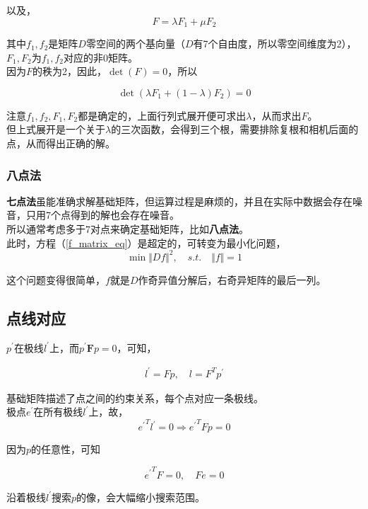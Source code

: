 		以及，
		$$
			F = \lambda F_1 + \mu F_2
		$$

		其中$f_1,f_2$是矩阵$D$零空间的两个基向量（$D$有7个自由度，所以零空间维度为2），$F_1,F_2$为$f_1,f_2$对应的非0矩阵。\\

		因为$F$的秩为2，因此，$\det(F) = 0$，所以

		$$
			\det(\lambda F_1 + (1-\lambda) F_2) = 0
		$$

		注意$f_1,f_2,F_1,F_2$都是确定的，上面行列式展开便可求出$\lambda$，从而求出$F$。\\

		但上式展开是一个关于$\lambda$的三次函数，会得到三个根，需要排除复根和相机后面的点，从而得出正确的解。

	\subsubsection*{八点法}	
		\textbf{七点法}虽能准确求解基础矩阵，但运算过程是麻烦的，并且在实际中数据会存在噪音，只用7个点得到的解也会存在噪音。\\

		所以通常考虑多于7对点来确定基础矩阵，比如\textbf{八点法}。\\

		此时，方程（\ref{f_matrix_eq}）是超定的，可转变为最小化问题，
		$$
			\min \Vert Df\Vert^2 ,\quad s.t. \quad \Vert f\Vert = 1
		$$

		这个问题变得很简单，$f$就是$D$作奇异值分解后，右奇异矩阵的最后一列。

	\subsection*{点线对应}

		$p^{\prime}$在极线$l^{\prime}$上，而$p^\prime \mathbf{F} p=0$，可知，

	\begin{align*}
		l^{\prime} = Fp,\quad 
		l = F^Tp^\prime
	\end{align*}

	基础矩阵描述了点之间的约束关系，每个点对应一条极线。\\

	极点$e^\prime$在所有极线$l^\prime$上，故，
	$$
		{e^\prime}^T l^\prime = 0 \Rightarrow {e^\prime}^TFp=0 
	$$

	因为$p$的任意性，可知

	$$
		{e^\prime}^T F = 0, \quad Fe = 0
	$$

	沿着极线$l^\prime$搜索$p$的像，会大幅缩小搜索范围。

